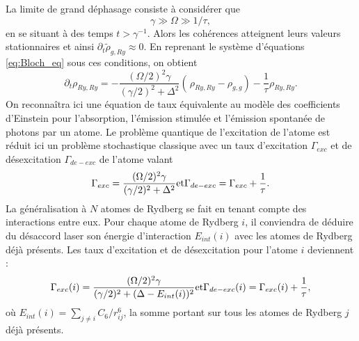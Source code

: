 La limite de grand déphasage consiste à considérer que
\begin{equation}
\label{eq:strong_dephasing}
\gamma \gg \Omega \gg 1/\tau,
\end{equation}
en se situant à des temps $t > \gamma^{-1}$.
Alors les cohérences atteignent leurs valeurs stationnaires et ainsi $\partial_t \tilde{\rho}_{g,Ry} \approx 0$.
En reprenant le système d'équations \eqref{eq:Bloch_eq} sous ces conditions, on obtient 
\begin{equation}
\label{eq:Bloch_approx}
\partial_t \rho_{Ry,Ry} = -\frac{(\Omega/2)^2 \gamma}{(\gamma/2)^2 + \Delta^2} \left(\frac{}{}\! \rho_{Ry,Ry} - \rho_{g,g} \right) - \frac{1}{\tau} \rho_{Ry,Ry}.
\end{equation}
On reconnaîtra ici une équation de taux équivalente au modèle des coefficients d'Einstein pour l'absorption, l'émission stimulée et l'émission spontanée de photons par un atome.
Le problème quantique de l'excitation de l'atome est réduit ici un problème stochastique classique avec un taux d'excitation $\Gamma_{exc}$ et de désexcitation $\Gamma_{de-exc}$ de l'atome valant
\begin{equation}
\label{eq:exc_de-exc_rate_1at}
\Gamma_{exc} = \frac{(\Omega/2)^2 \gamma}{(\gamma/2)^2 + \Delta^2} \hfill \text{et} \hfill
\Gamma_{de-exc} = \Gamma_{exc}+\frac{1}{\tau}. \hfill
\end{equation}
La généralisation à $N$ atomes de Rydberg se fait en tenant compte des interactions entre eux.
Pour chaque atome de Rydberg $i$, il conviendra de déduire du désaccord laser son énergie d'interaction $E_{int}(i)$ avec les atomes de Rydberg déjà présents.
Les taux d'excitation et de désexcitation pour l'atome $i$ deviennent :
\begin{equation}
\label{eq:exc_de-exc_rate_atomi}
\Gamma_{exc}(i) = \frac{(\Omega/2)^2 \gamma}{(\gamma/2)^2 + (\Delta - E_{int}(i))^2} \hfill \text{et} \hfill
\Gamma_{de-exc}(i) = \Gamma_{exc}(i)+\frac{1}{\tau}, \hfill
\end{equation}
où $E_{int}(i) = \sum_{j\neq i} C_6/r_{ij}^6$, la somme portant sur tous les atomes de Rydberg $j$ déjà présents.

